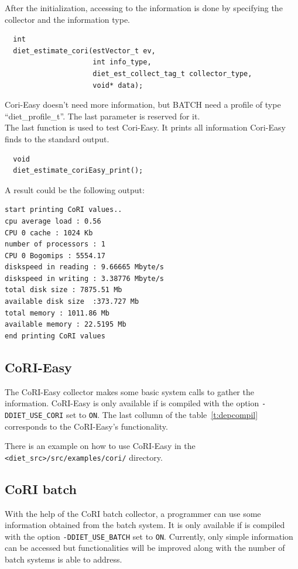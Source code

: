 After the initialization, accessing to the information is done by specifying
the collector and the information type.
\footnotesize
\begin{verbatim}
  int
  diet_estimate_cori(estVector_t ev,
                     int info_type,
                     diet_est_collect_tag_t collector_type,
                     void* data);
\end{verbatim}
\normalsize

Cori-Easy doesn't need more information, but BATCH need a profile of
type ``diet\_profile\_t''. The last parameter is reserved for it. \\ The last
function is used to test Cori-Easy. It prints all information Cori-Easy finds
to the standard output.

\footnotesize
\begin{verbatim}
  void
  diet_estimate_coriEasy_print();
\end{verbatim}
\normalsize
A result could be the following output:
\footnotesize
\begin{verbatim}
start printing CoRI values..
cpu average load : 0.56
CPU 0 cache : 1024 Kb
number of processors : 1
CPU 0 Bogomips : 5554.17
diskspeed in reading : 9.66665 Mbyte/s
diskspeed in writing : 3.38776 Mbyte/s
total disk size : 7875.51 Mb
available disk size  :373.727 Mb
total memory : 1011.86 Mb
available memory : 22.5195 Mb
end printing CoRI values
\end{verbatim}
\normalsize

\subsection{CoRI-Easy}
The CoRI-Easy collector makes some basic system calls to gather the
information. CoRI-Easy is only available if \diet is compiled with the option
\texttt{-DDIET\_USE\_CORI} set to \texttt{ON}. The last collumn of the
table~\ref{t:depcompil} corresponds to the CoRI-Easy's functionality.

There is an example on how to use CoRI-Easy in the
\verb!<diet_src>/src/examples/cori/! directory.

\subsection{CoRI batch}\label{section:cori_batch}

With the help of the CoRI batch collector, a \sed programmer can use some
information obtained from the batch system. It is only available if \diet is
compiled with the option \texttt{-DDIET\_USE\_BATCH} set to
\texttt{ON}. Currently, only simple information can be accessed but
functionalities will be improved along with the number of batch systems \diet
is able to address.

